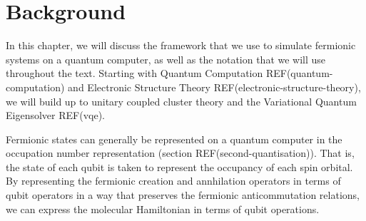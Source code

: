 \chapter{\label{background}Background}
In this chapter, we will discuss the framework that we use to simulate fermionic systems on a quantum computer, as well as the notation that we will use throughout the text. Starting with Quantum Computation REF(quantum-computation) and Electronic Structure Theory REF(electronic-structure-theory), we will build up to unitary coupled cluster theory and the Variational Quantum Eigensolver REF(vqe).

Fermionic states can generally be represented on a quantum computer in the occupation number representation (section REF(second-quantisation)). That is, the state of each qubit is taken to represent the occupancy of each spin orbital. By representing the fermionic creation and annhilation operators in terms of qubit operators in a way that preserves the fermionic anticommutation relations, we can express the molecular Hamiltonian in terms of qubit operations.
